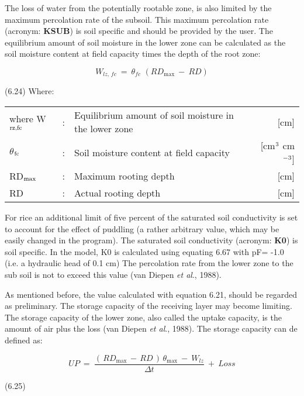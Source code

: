 The loss of water from the potentially rootable zone, is also limited by the maximum
percolation rate of the subsoil. This maximum percolation rate (acronym: {\bf KSUB}) is soil
specific and should be provided by the user. The equilibrium amount of soil moisture in
the lower zone can be calculated as the soil moisture content at field capacity times the
depth of the root zone:

\begin{equation}
W _{lz,\, fc} ~=~ \theta  _{fc} \,\, (RD _{\max} ~-~RD)
\end{equation}

 
\strut\hfill (6.24)
Where:\\
\begin{tabularx}{\textwidth}{llXr}



where W$_{{\rm rz,fc}}$ &:& Equilibrium amount of soil moisture in the lower zone  & [cm]\\
$\theta$$_{{\rm fc}}$ &:& Soil moisture content at field capacity  & [cm$^{{\rm 3}}$ cm$^{{\rm -3}}$]\\
RD$_{{\rm max}}$ &:& Maximum rooting depth  & [cm]\\
RD &:& Actual rooting depth  & [cm]
\end{tabularx}
 For rice an addi\-tional limit of five percent of the saturated soil conductivity is set to
account for the effect of puddling (a rather arbitrary value, which may be easily changed
in the program). The saturated soil conductivity (acronym: {\bf K0}) is soil specific. In the
model, K0 is calculated using equating 6.67 with pF= -1.0 (i.e. a hydraulic head of 0.1
cm) The percolation rate from the lower zone to the sub soil is not to exceed this value
(van Diepen {\it et al\/}., 1988). 



As mentioned before, the value calculated with equation 6.21, should be regarded as
preliminary. The storage capacity of the receiving layer may become limiting. The
storage capacity of the lower zone, also called the uptake capacity, is the amount of air
plus the loss (van Diepen {\it et al\/}., 1988). The storage capacity can de defined as:

\begin{equation}
UP  ~=~{\frac{(\, RD _{\max } \, -\, RD\, )\, \theta  _{\max } ~-~ W _{lz} }{\Delta t}} ~+~ Loss
\end{equation}

 
\strut\hfill (6.25)

